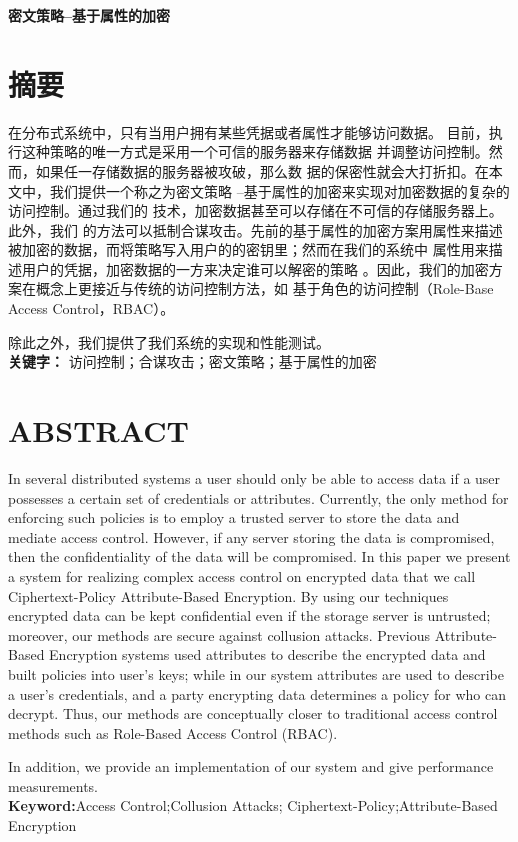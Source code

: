 \centerline{\bfseries 密文策略--基于属性的加密}
\chapter*{摘\qquad 要}
在分布式系统中，只有当用户拥有某些凭据或者属性才能够访问数据。
目前，执行这种策略的唯一方式是采用一个可信的服务器来存储数据
并调整访问控制。然而，如果任一存储数据的服务器被攻破，那么数
据的保密性就会大打折扣。在本文中，我们提供一个称之为密文策略
--基于属性的加密来实现对加密数据的复杂的访问控制。通过我们的
技术，加密数据甚至可以存储在不可信的存储服务器上。此外，我们
的方法可以抵制合谋攻击。先前的基于属性的加密方案用属性来描述
被加密的数据，而将策略写入用户的的密钥里；然而在我们的系统中
属性用来描述用户的凭据，加密数据的一方来决定谁可以解密的策略
。因此，我们的加密方案在概念上更接近与传统的访问控制方法，如
基于角色的访问控制（Role-Base Access Control，RBAC）。\par
除此之外，我们提供了我们系统的实现和性能测试。\\
\textbf{关键字：} 访问控制；合谋攻击；密文策略；基于属性的加密
\chapter*{ABSTRACT}
In several distributed systems a user should only be %
able to access data if a user possesses a certain set of %
credentials or attributes. Currently, the only method %
for enforcing such policies is to employ a trusted server %
to store the data and mediate access control. However, %
if any server storing the data is compromised, then the %
confidentiality of the data will be compromised. In this %
paper we present a system for realizing complex access %
control on encrypted data that we call Ciphertext-Policy %
Attribute-Based Encryption. By using our techniques %
encrypted data can be kept confidential even if the %
storage server is untrusted; moreover, our methods are %
secure against collusion attacks. Previous Attribute-Based %
Encryption systems used attributes to describe %
the encrypted data and built policies into user’s keys;%
while in our system attributes are used to describe a %
user’s credentials, and a party encrypting data determines %
a policy for who can decrypt. Thus, our methods %
are conceptually closer to traditional access control %
methods such as Role-Based Access Control (RBAC).\par
In addition, we provide an implementation of our system %
and give performance measurements.\\
\textbf{Keyword:}Access Control;Collusion Attacks;%
Ciphertext-Policy;Attribute-Based Encryption
